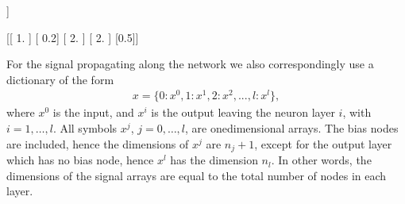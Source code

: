 \documentclass[a4paper,12pt,polish]{jupyterBook}
\begin{document}
\begin{sphinxVerbatimInput}

\begin{sphinxVerbatim}[commandchars=\\\{\}]
\PYG{p}{[}\PYG{p}{[}\PYG{p}{]}\PYG{p}{[}\PYG{p}{]}\PYG{p}{[}\PYG{p}{]}\PYG{p}{]}\PYG{p}{[}\PYG{p}{[}\PYG{p}{]}\PYG{p}{[}\PYG{p}{]}\PYG{p}{[}\PYG{p}{]}\PYG{p}{[}\PYG{p}{]}\PYG{p}{[}\PYG{p}{]}\PYG{p}{]}

\PYG{p}{[}\PYG{p}{]}
\PYG{p}{[}\PYG{p}{]}
\end{sphinxVerbatim}
\end{sphinxVerbatimInput}
\begin{sphinxVerbatimOutput}

\begin{sphinxVerbatim}[commandchars=\\\{\}]
[[ 1.   2.   1.   1. ]
 [ 2.  \PYGZhy{}3.   0.2  2. ]
 [\PYGZhy{}3.  \PYGZhy{}3.   5.   7. ]]

[[ 1. ]
 [ 0.2]
 [ 2. ]
 [ 2. ]
 [\PYGZhy{}0.5]]
\end{sphinxVerbatim}
\end{sphinxVerbatimOutput}

\sphinxAtStartPar
For the signal propagating along the network we also correspondingly use a dictionary of the form
\begin{equation*}
\begin{split}x=\{0: x^0, 1: x^1, 2: x^2, ..., l: x^l\},\end{split}
\end{equation*}
\sphinxAtStartPar
where \(x^0\) is the input, and \(x^i\) is the output leaving the neuron layer \(i\), with \(i=1, \dots, l\). All symbols \(x^j\), \(j=0, \dots, l\), are one\sphinxhyphen{}dimensional arrays. The bias nodes are included, hence the dimensions of \(x^j\) are \(n_j+1\), except for the output layer which has no bias node, hence \(x^l\) has the dimension \(n_l\). In other words, the dimensions of the signal arrays are equal to the total number of nodes in each layer.
\end{document}
